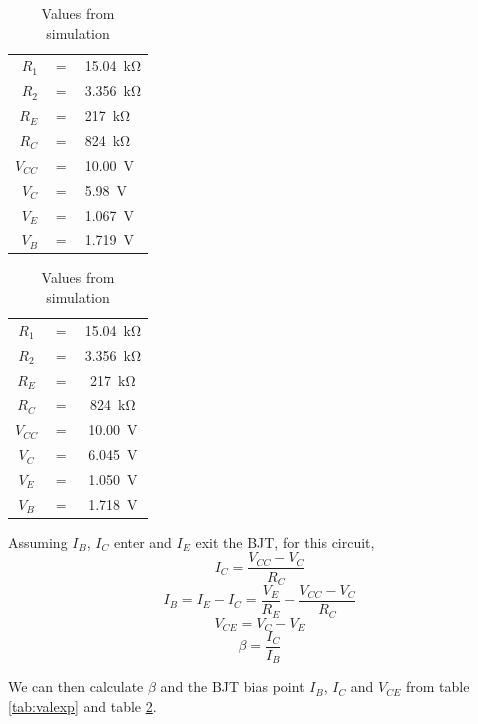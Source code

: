 \documentclass{article}
\begin{document}
\begin{table}[H]
  \parbox{.45\linewidth}{
  \centering
  \begin{tabular}{rcl}
  $R_1$   &$=$&\SI{15.04}{\kilo\ohm}\\
  $R_2$   &$=$&\SI{3.356}{\kilo\ohm}\\
  $R_E$   &$=$&\SI{217}{\kilo\ohm}\\
  $R_C$   &$=$&\SI{824}{\kilo\ohm}\\
  $V_{CC}$&$=$&\SI{10.00}{\volt}\\
  $V_{C} $&$=$&\SI{5.98}{\volt}\\
  $V_{E} $&$=$&\SI{1.067}{\volt}\\
  $V_{B} $&$=$&\SI{1.719}{\volt}\\
  \end{tabular}
  \caption{Values from circuit}
  \label{tab:valexp}
  }
  \hfill
  \parbox{.45\linewidth}{
  \centering
  \begin{tabular}{ccc}
  $R_1$   &$=$&\SI{15.04}{\kilo\ohm}\\
  $R_2$   &$=$&\SI{3.356}{\kilo\ohm}\\
  $R_E$   &$=$&\SI{217}{\kilo\ohm}\\
  $R_C$   &$=$&\SI{824}{\kilo\ohm}\\
  $V_{CC}$&$=$&\SI{10.00}{\volt}\\
  $V_{C} $&$=$&\SI{6.045}{\volt}\\
  $V_{E} $&$=$&\SI{1.050}{\volt}\\
  $V_{B} $&$=$&\SI{1.718}{\volt}\\  
  \end{tabular}
  \caption{Values from simulation}
  \label{tab:valsim}
  }
  \end{table}

Assuming $I_B$, $I_C$ enter and $I_E$ exit the BJT, for this circuit,
$$ I_C =  \frac{V_{CC}-V_C}{R_C}$$
$$ I_B =  I_E - I_C = \frac{V_E}{R_E}-\frac{V_{CC}-V_C}{R_C}$$
$$ V_{CE} = V_C - V_E $$
$$\beta = \frac{I_C}{I_B}$$

We can then calculate $\beta$ and the BJT bias point $I_B$, $I_C$ and $V_{CE}$ from table \ref{tab:valexp} and table \ref{tab:valsim}.
\end{document}
